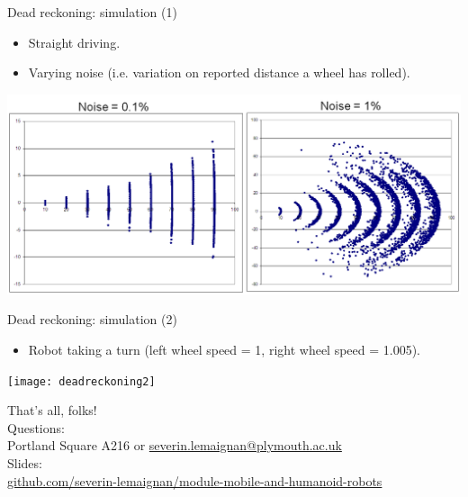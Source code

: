 \documentclass[compress]{beamer}
\begin{document}
\begin{frame}{Dead reckoning: simulation (1)}

\begin{itemize}
    \item Straight driving.
    \item Varying noise (i.e. variation on reported distance a wheel has
  rolled).
\end{itemize}

    \begin{center}
        \includegraphics[width=0.7\linewidth]{deadreckoning1}
    \end{center}

\end{frame}

\begin{frame}{Dead reckoning: simulation (2)}

\begin{itemize}
    \item Robot taking a turn (left wheel speed = 1, right wheel speed = 1.005).
\end{itemize}

    \begin{center}
        \texttt{[image: deadreckoning2]}
    \end{center}
\end{frame}


\begin{frame}{}
    \begin{center}
        \Large
        That's all, folks!\\[2em]
        \normalsize
        Questions:\\
        Portland Square A216 or \url{severin.lemaignan@plymouth.ac.uk} \\[1em]

        Slides:\\ \href{https://github.com/severin-lemaignan/module-mobile-and-humanoid-robots}{\small github.com/severin-lemaignan/module-mobile-and-humanoid-robots}

    \end{center}
\end{frame}
\end{document}
